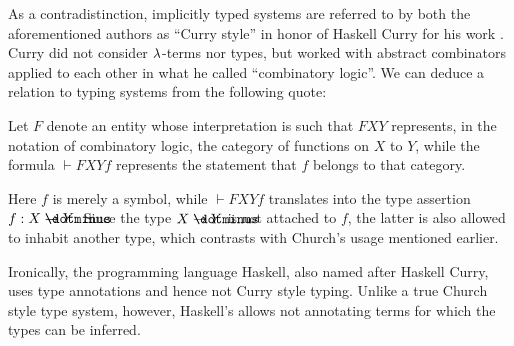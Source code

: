 \begin{remark}
  As a contradistinction, implicitly typed systems are referred to by both the aforementioned authors as \enquote{Curry style} in honor of Haskell Curry for his work \cite{Curry1934FunctionalityInCombinatoryLogic}. Curry did not consider \( {\mathrm \lambda} \)-terms nor types, but worked with abstract combinators applied to each other in what he called \enquote{combinatory logic}. We can deduce a relation to typing systems from the following quote:
  \begin{displayquote}
    Let \( F \) denote an entity whose interpretation is such that \( FXY \) represents, in the notation of combinatory logic, the category of functions on \( X \) to \( Y \), while the formula \( \vdash FXYf \) represents the statement that \( f \) belongs to that category.
  \end{displayquote}

  Here \( f \) is merely a symbol, while \( \vdash FXYf \) translates into the type assertion \( f: X \synimplies Y \). Since the type \( X \synimplies Y \) is not attached to \( f \), the latter is also allowed to inhabit another type, which contrasts with Church's usage mentioned earlier.

  Ironically, the programming language Haskell, also named after Haskell Curry, uses type annotations and hence not Curry style typing. Unlike a true Church style type system, however, Haskell's allows not annotating terms for which the types can be inferred.
\end{remark}

